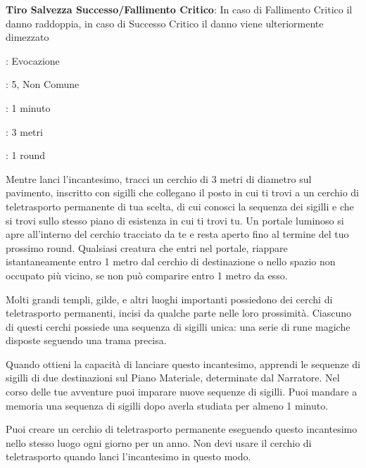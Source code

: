 \begin{multicols}{2}
\textbf{Tiro Salvezza Successo/Fallimento Critico}: In caso di Fallimento Critico il danno raddoppia, in caso di Successo Critico il danno viene ulteriormente dimezzato

\noindent\colorbox{OBSSgold!10}{
\begin{minipage}{0.95\linewidth}
\begin{description}[noitemsep, topsep=0pt, parsep=0pt, partopsep=0pt, leftmargin=0cm, labelwidth=1.3cm]
	\item[\textbf{Lista}]: Evocazione
	\item[\textbf{Livello}]: 5, Non Comune
	\item[\textbf{Lancio}]: 1 minuto
	\item[\textbf{Gittata}]: 3 metri
	\item[\textbf{Durata}]: 1 round
\end{description}
\end{minipage}}\smallskip

Mentre lanci l'incantesimo, tracci un cerchio di 3 metri di diametro sul pavimento, inscritto con sigilli che collegano il posto in cui ti trovi a un cerchio di teletrasporto permanente di tua scelta, di cui conosci la sequenza dei sigilli e che si trovi sullo stesso piano di esistenza in cui ti trovi tu. Un portale luminoso si apre all'interno del cerchio tracciato da te e resta aperto fino al termine del tuo prossimo round. Qualsiasi creatura che entri nel portale, riappare istantaneamente entro 1 metro dal cerchio di destinazione o nello spazio non occupato più vicino, se non può comparire entro 1 metro da esso.

Molti grandi templi, gilde, e altri luoghi importanti possiedono dei cerchi di teletrasporto permanenti, incisi da qualche parte nelle loro prossimità. Ciascuno di questi cerchi possiede una sequenza di sigilli unica: una serie di rune magiche disposte seguendo una trama precisa.

Quando ottieni la capacità di lanciare questo incantesimo, apprendi le sequenze di sigilli di due destinazioni sul Piano Materiale, determinate dal Narratore. Nel corso delle tue avventure puoi imparare nuove sequenze di sigilli. Puoi mandare a memoria una sequenza di sigilli dopo averla studiata per almeno 1 minuto.

Puoi creare un cerchio di teletrasporto permanente eseguendo questo incantesimo nello stesso luogo ogni giorno per un anno. Non devi usare il cerchio di teletrasporto quando lanci l'incantesimo in questo modo.


\end{multicols}
